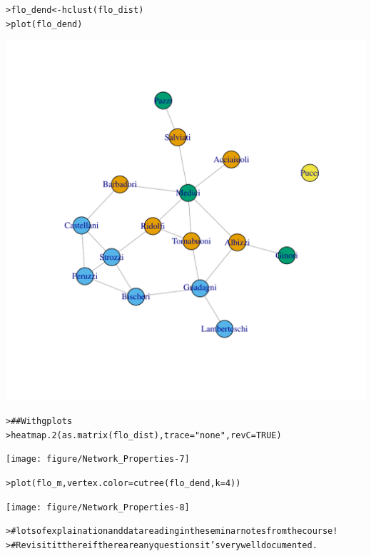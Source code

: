 \documentclass[12pt]{article}\usepackage[]{graphicx}\usepackage[]{color}
\makeatletter
\newcommand{\hlnum}[1]{\textcolor[rgb]{0.82,0.78,0.62}{#1}}%
\newcommand{\hlstr}[1]{\textcolor[rgb]{0.82,0.78,0.62}{#1}}%
\newcommand{\hlcom}[1]{\textcolor[rgb]{0.404,0.408,0.42}{#1}}%
\newcommand{\hlstd}[1]{\textcolor[rgb]{0.882,0.878,0.898}{#1}}%
\newcommand{\hlkwb}[1]{\textcolor[rgb]{0.902,0.675,0.196}{#1}}%
\newcommand{\hlkwc}[1]{\textcolor[rgb]{0.812,0.522,0.388}{#1}}%
\newcommand{\hlkwd}[1]{\textcolor[rgb]{0.733,0.388,0.812}{#1}}%
\newenvironment{kframe}{%
 \def\at@end@of@kframe{}%
 \ifinner\ifhmode%
  \def\at@end@of@kframe{\end{minipage}}%
  \begin{minipage}{\columnwidth}%
 \fi\fi%
 \def\FrameCommand##1{\hskip\@totalleftmargin \hskip-\fboxsep
 \colorbox{shadecolor}{##1}\hskip-\fboxsep
     \hskip-\linewidth \hskip-\@totalleftmargin \hskip\columnwidth}%
 \MakeFramed {\advance\hsize-\width
   \@totalleftmargin\z@ \linewidth\hsize
   \@setminipage}}%
 {\par\unskip\endMakeFramed%
 \at@end@of@kframe}
\newenvironment{knitrout}{}{} %
\makeatother
\begin{document}
\begin{flushleft}
\begin{center}
\begin{knitrout}
\begin{kframe}
\begin{alltt}
\hlstd{> }\hlstd{flo_dend} \hlkwb{<-} \hlkwd{hclust}\hlstd{(flo_dist)}
\hlstd{> }\hlkwd{plot}\hlstd{(flo_dend)}
\end{alltt}
\end{kframe}
\includegraphics[width=6in]{figure/Network_Properties-6} 
\begin{kframe}\begin{alltt}
\hlstd{> }\hlcom{## With gplots}
\hlstd{> }\hlkwd{heatmap.2}\hlstd{(}\hlkwd{as.matrix}\hlstd{(flo_dist),}\hlkwc{trace}\hlstd{=}\hlstr{"none"}\hlstd{,}\hlkwc{revC}\hlstd{=}\hlnum{TRUE}\hlstd{)}
\end{alltt}
\end{kframe}
\texttt{[image: figure/Network\_Properties-7]} 
\begin{kframe}\begin{alltt}
\hlstd{> }\hlkwd{plot}\hlstd{(flo_m,}\hlkwc{vertex.color}\hlstd{=}\hlkwd{cutree}\hlstd{(flo_dend,} \hlkwc{k}\hlstd{=}\hlnum{4}\hlstd{))}
\end{alltt}
\end{kframe}
\texttt{[image: figure/Network\_Properties-8]} 
\begin{kframe}\begin{alltt}
\hlstd{> }\hlcom{# lots of explaination and data reading in the seminar notes from the course!}
\hlstd{> }\hlcom{#   Revisit it there if there are any questions it's very well documented.}
\end{alltt}
\end{kframe}
\end{knitrout}
\end{center}


\end{flushleft}
\end{document}
